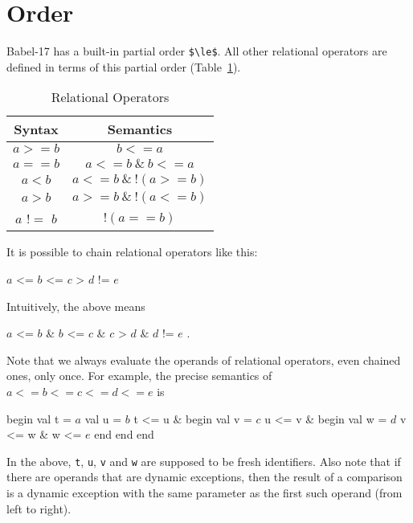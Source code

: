 \documentclass[11pt]{amsart}
\newcommand{\babelsrc}[1] {\lstinline!#1!}
\begin{document}
\section{Order}
Babel-17 has a built-in partial order \babelsrc{$\le$}. All other relational operators are defined in terms of this partial order (Table~\ref{tab:relops}).
\begin{table}
\caption{Relational Operators}
\begin{tabular}{c|c}
\textbf{Syntax} & \textbf{Semantics} \\\hline
$a >= b$ & $b <= a$ \\
$a == b$ & $a <= b\ \&\ b <= a$ \\
$a < b$ & $a <= b\ \&\ !(a >= b)$ \\
$a > b$ & $a >= b\ \&\ !(a <= b)$ \\
$a$ $!=$ $b$ & $! (a == b)$ \\
\end{tabular}
\label{tab:relops}
\end{table}
It is possible to chain relational operators like this:
\begin{babellisting}
$a$ <= $b$ <= $c$ > $d$ != $e$ 
\end{babellisting}
Intuitively, the above means 
\begin{babellisting}
$a$ <= $b$ & $b$ <= $c$  & $c$ > $d$  & $d$ != $e$ .
\end{babellisting}
Note that  we always evaluate the operands  of relational operators, even chained ones, only once. For example, the precise semantics of $a <= b <= c <= d <= e$ is 
\begin{babellisting}
begin
  val t = $a$
  val u = $b$
  t <= u &
  begin
    val v = $c$
    u <= v & 
    begin
      val w = $d$
      v <= w & w <= $e$
    end
  end
end
\end{babellisting}
In the above, \babelsrc{t}, \babelsrc{u}, \babelsrc{v} and \babelsrc{w} are supposed to be fresh identifiers.  Also note that if there are operands that are dynamic exceptions, then the result of a comparison is a dynamic exception with the same parameter as the first such operand (from left to right).
\end{document}
